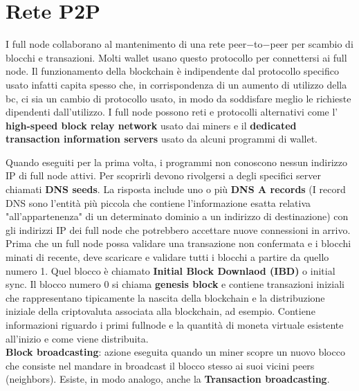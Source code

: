 \section{Rete P2P}
I full node collaborano al mantenimento di una rete peer$-$to$-$peer per scambio di blocchi e transazioni. Molti wallet usano questo protocollo per connettersi ai full node. Il funzionamento della blockchain è indipendente dal protocollo specifico usato infatti capita spesso che, in corrispondenza di un aumento di utilizzo della bc, ci sia un cambio di protocollo usato, in modo da soddisfare meglio le richieste dipendenti dall'utilizzo. I full node possono reti e protocolli alternativi come l' \textbf{high-speed block relay network} usato dai miners e il \textbf{dedicated transaction information servers} usato da alcuni programmi di wallet. 

Quando eseguiti per la prima volta, i programmi non conoscono nessun indirizzo IP di full node attivi. Per scoprirli devono rivolgersi a degli specifici server chiamati \textbf{DNS seeds}. La risposta include uno o più \textbf{DNS A records} (I record DNS sono l'entità più piccola che contiene l'informazione esatta relativa "all'appartenenza" di un determinato dominio a un indirizzo di destinazione) con gli indirizzi IP dei full node che potrebbero accettare nuove connessioni in arrivo.\\

Prima che un full node possa validare una transazione non confermata e i blocchi minati di recente, deve scaricare e validare tutti i blocchi a partire da quello numero 1. Quel blocco è chiamato \textbf{Initial Block Downlaod (IBD)} o initial sync. Il blocco numero 0 si chiama \textbf{genesis block} e contiene transazioni iniziali che rappresentano tipicamente la nascita della blockchain e la distribuzione iniziale della criptovaluta associata alla blockchain, ad esempio. Contiene informazioni riguardo i primi fullnode e la quantità di moneta virtuale esistente all'inizio e come viene distribuita.\\

\textbf{Block broadcasting}: azione eseguita quando un miner scopre un nuovo blocco che consiste nel mandare in broadcast il blocco stesso ai suoi vicini peers (neighbors). Esiste, in modo analogo, anche la \textbf{Transaction broadcasting}. 


